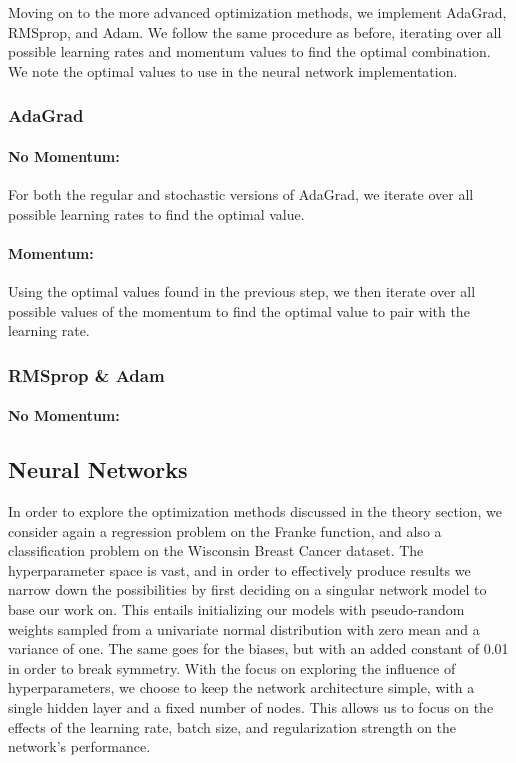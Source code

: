 \documentclass[aps,pra,english,notitlepage,reprint,nofootinbib]{revtex4-1}  %
\begin{document}
Moving on to the more advanced optimization methods, we implement AdaGrad, RMSprop, and Adam. We follow the same procedure as before, iterating over all possible learning rates and momentum values to find the optimal combination. We note the optimal values to use in the neural network implementation.

\begin{comment}
  #TODO: Update if we iterate over momentum and rho values as well
\end{comment}

\subsubsection{AdaGrad}
\paragraph{No Momentum:}
For both the regular and stochastic versions of AdaGrad, we iterate over all possible learning rates to find the optimal value.

\paragraph{Momentum:}
Using the optimal values found in the previous step, we then iterate over all possible values of the momentum to find the optimal value to pair with the learning rate.

\subsubsection{RMSprop \& Adam}
\paragraph{No Momentum:}

\subsection{Neural Networks}
In order to explore the optimization methods discussed in the theory section, we consider again a regression problem on the Franke function, and also a classification problem on the Wisconsin Breast Cancer dataset. %
The hyperparameter space is vast, and in order to effectively produce results we narrow down the possibilities by first deciding on a singular network model to base our work on. This entails initializing our models with pseudo-random weights sampled from a univariate normal distribution with zero mean and a variance of one. The same goes for the biases, but with an added constant of 0.01 in order to break symmetry. With the focus on exploring the influence of hyperparameters, we choose to keep the network architecture simple, with a single hidden layer and a fixed number of nodes. This allows us to focus on the effects of the learning rate, batch size, and regularization strength on the network's performance.
\end{document}
